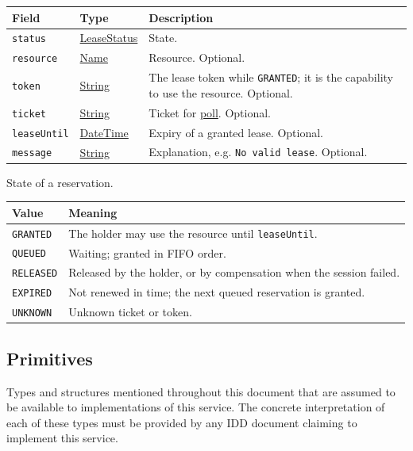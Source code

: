 \documentclass[a4paper]{arrowhead}
\newcommand{\mref}[1]{{\textcolor{ArrowheadPurple}{\hyperref[sec:model:#1]{#1}}}}
\newcommand{\oref}[1]{{\textcolor{ArrowheadBlue}{\hyperref[sec:operations:#1]{#1}}}}
\newcommand{\pref}[1]{{\textcolor{ArrowheadGrey}{\hyperref[sec:model:primitives:#1]{#1}}}}
\begin{document}
{\small
\begin{longtable}{|p{3.9cm}|p{4.4cm}|p{7.5cm}|}

\hline
\rowcolor{gray!33} Field & Type & Description \\ \hline
\endhead
\texttt{status} & \mref{LeaseStatus} & State. \\ \hline
\texttt{resource} & \pref{Name} & Resource. Optional. \\ \hline
\texttt{token} & \pref{String} & The lease token while \texttt{GRANTED}; it is the capability to use the resource. Optional. \\ \hline
\texttt{ticket} & \pref{String} & Ticket for \oref{poll}. Optional. \\ \hline
\texttt{leaseUntil} & \pref{DateTime} & Expiry of a granted lease. Optional. \\ \hline
\texttt{message} & \pref{String} & Explanation, e.g. \texttt{No valid lease}. Optional. \\ \hline
\end{longtable}
}

State of a reservation.

{\small
\begin{longtable}{|p{3.9cm}|p{11.9cm}|}

\hline
\rowcolor{gray!33} Value & Meaning \\ \hline
\endhead
\texttt{GRANTED} & The holder may use the resource until \texttt{leaseUntil}. \\ \hline
\texttt{QUEUED} & Waiting; granted in FIFO order. \\ \hline
\texttt{RELEASED} & Released by the holder, or by compensation when the session failed. \\ \hline
\texttt{EXPIRED} & Not renewed in time; the next queued reservation is granted. \\ \hline
\texttt{UNKNOWN} & Unknown ticket or token. \\ \hline
\end{longtable}
}


\subsection{Primitives}
\label{sec:model:primitives}
Types and structures mentioned throughout this document that are assumed to be available to implementations of this
service. The concrete interpretation of each of these types must be provided by any IDD document claiming to implement
this service.
\end{document}
